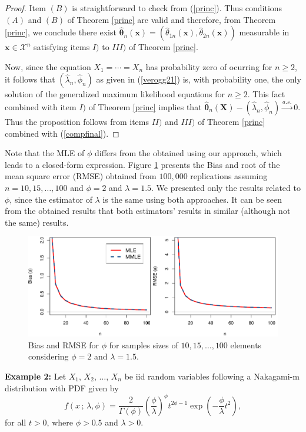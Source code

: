\documentclass[lineno]{biometrika}
\newcommand{\bs}{\boldsymbol}
\begin{document}
\begin{proof}
Item $(B)$ is straightforward to check from (\ref{princ}). Thus conditions $(A)$ and $(B)$ of Theorem \ref{princ} are valid and therefore, from Theorem \ref{princ}, we conclude there exist $\bs{\hat{\theta}}_n(\bs{x})=(\hat{\theta}_{1n}(\bs{x}),\hat{\theta}_{2n}(\bs{x}))$ measurable in $\bs{x}\in \mathcal{X}^n$ satisfying items $I)$ to $III)$ of Theorem \ref{princ}.

 Now, since the equation $X_1=\cdots=X_n$ has probability zero of ocurring for $n\geq 2$, it follows that $(\hat\lambda_n,\hat\phi_n)$ as given in (\ref{verogg21}) is, with probability one, the only solution of the generalized maximum likelihood equations for $n\geq 2$.
This fact combined with item $I)$ of Theorem \ref{princ} implies that $\bs{\hat{\theta}}_n(\bs{X})-(\hat\lambda_n,\hat\phi_n)\overset{a.s.}{\to} 0$. Thus the proposition follows from items $II)$ and $III)$ of Theorem \ref{princ}  combined with (\ref{compfinal}).
\end{proof}

Note that the MLE of $\phi$ differs from the obtained using our approach, which leads to a closed-form expression. Figure \ref{fg1} presents the Bias and root of the mean square error (RMSE) obtained from $100,000$ replications assuming $n=10,15,\ldots,100$ and $\phi=2$ and $\lambda=1.5$. We presented only the results related to $\phi$, since the estimator of $\lambda$ is the same using both approaches. It can be seen from the obtained results that both estimators' results in similar (although not the same) results.
\begin{figure}[!ht]
\centering
\includegraphics[scale=0.6]{biasgamma.pdf}	
\caption{Bias and RMSE for $\phi$ for samples sizes of $10,15,\ldots,100$ elements considering $\phi=2$ and $\lambda=1.5$.}\label{fg1}
\end{figure}

\noindent\textbf{Example 2:} Let $X_1$, $X_2$, $\ldots$, $X_n$ be iid random variables following a Nakagami-m distribution with PDF given by
\begin{equation*}\label{fdpnk}
f(x\,;\,\lambda,\phi)=\frac{2}{\Gamma(\phi)}\left(\frac{\phi}{\lambda} \right)^\phi t^{2\phi-1}\exp\left(-\frac{\phi}{\lambda} t^2 \right), 
\end{equation*}
for all $t>0$, where $\phi> 0.5$ and $\lambda>0$.
\end{document}
